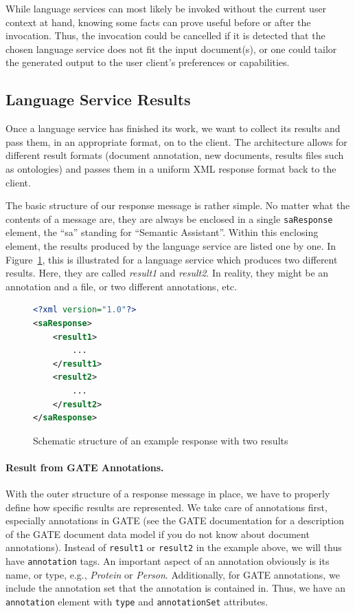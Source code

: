 While language services can most likely be invoked without the current
user context at hand, knowing some facts can prove useful before or
after the invocation. Thus, the invocation could be cancelled if it
is detected that the chosen language service does not fit the input
document(s), or one could tailor the generated output to the user
client's preferences or capabilities.


\subsection{Language Service Results}
\label{sec:response}
Once a language service has finished its work, we want to collect its
results and pass them, in an appropriate format, on to the client. The
\sa architecture allows for different result formats (document
annotation, new documents, results files such as ontologies) and
passes them in a uniform XML response format back to the client.

The basic structure of our response message is rather simple. No
matter what the contents of a message are, they are always be enclosed
in a single \texttt{saResponse} element, the ``sa'' standing for
``Semantic Assistant''. Within this enclosing element, the results
produced by the language service are listed one by one. In
Figure~\ref{list:response1}, this is illustrated for a language
service which produces two different results. Here, they are called
\emph{result1} and \emph{result2}. In reality, they might be an
annotation and a file, or two different annotations, etc.

\begin{figure}[htb]
\begin{lstlisting}[language=XML,xleftmargin=8mm,columns=flexible]
<?xml version="1.0"?>
<saResponse>
    <result1>
        ...
    </result1>
    <result2>
        ...
    </result2>
</saResponse>
\end{lstlisting}
\caption{Schematic structure of an example response with two results}
\label{list:response1}
\end{figure}


\paragraph{Result from GATE Annotations.} With the outer structure of a response
message in place, we have to properly define how specific results are
represented. We take care of annotations first, especially annotations
in GATE (see the GATE documentation for a description of the GATE
document data model if you do not know about document annotations).
Instead of \texttt{result1} or \texttt{result2} in the example above,
we will thus have \texttt{annotation} tags. An important aspect of an
annotation obviously is its name, or type, e.g., \emph{Protein} or
\emph{Person}.  Additionally, for GATE annotations, we include the
annotation set that the annotation is contained in. Thus, we have an
\texttt{annotation} element with \texttt{type} and
\texttt{annotationSet} attributes.

